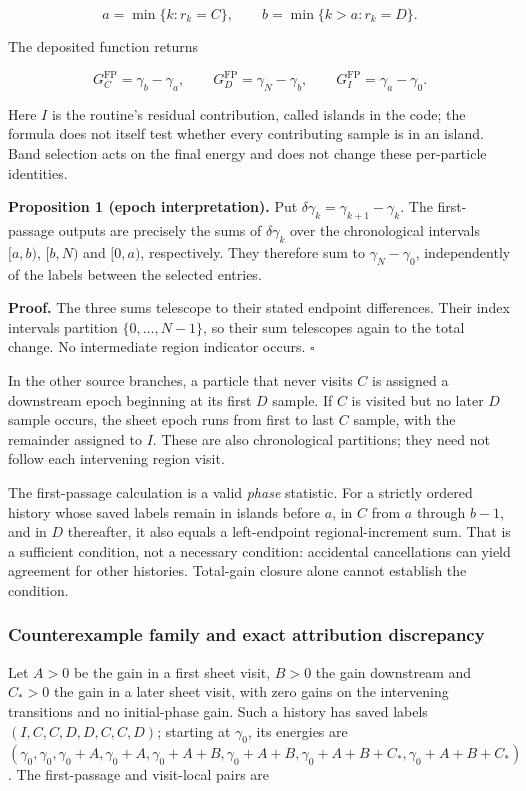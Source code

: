 \[
a=\min\{k:r_k=C\},\qquad
b=\min\{k>a:r_k=D\}.
\]

The deposited function returns

\[
G_C^{\mathrm{FP}}=\gamma_b-\gamma_a,\qquad
G_D^{\mathrm{FP}}=\gamma_N-\gamma_b,\qquad
G_I^{\mathrm{FP}}=\gamma_a-\gamma_0.
\]

Here \(I\) is the routine's residual contribution, called islands in the
code; the formula does not itself test whether every contributing sample
is in an island. Band selection acts on the final energy and does not
change these per-particle identities.

\textbf{Proposition 1 (epoch interpretation).} Put
\(\delta\gamma_k=\gamma_{k+1}-\gamma_k\). The first-passage outputs are
precisely the sums of \(\delta\gamma_k\) over the chronological
intervals \([a,b)\), \([b,N)\) and \([0,a)\), respectively. They
therefore sum to \(\gamma_N-\gamma_0\), independently of the labels
between the selected entries.

\textbf{Proof.} The three sums telescope to their stated endpoint
differences. Their index intervals partition \(\{0,\ldots,N-1\}\), so
their sum telescopes again to the total change. No intermediate region
indicator occurs. \(\square\)

In the other source branches, a particle that never visits \(C\) is
assigned a downstream epoch beginning at its first \(D\) sample. If
\(C\) is visited but no later \(D\) sample occurs, the sheet epoch runs
from first to last \(C\) sample, with the remainder assigned to \(I\).
These are also chronological partitions; they need not follow each
intervening region visit.

The first-passage calculation is a valid \emph{phase} statistic. For a
strictly ordered history whose saved labels remain in islands before
\(a\), in \(C\) from \(a\) through \(b-1\), and in \(D\) thereafter, it
also equals a left-endpoint regional-increment sum. That is a sufficient
condition, not a necessary condition: accidental cancellations can yield
agreement for other histories. Total-gain closure alone cannot establish
the condition.

\subsubsection{Counterexample family and exact attribution
discrepancy}\label{counterexample-family-and-exact-attribution-discrepancy}

Let \(A>0\) be the gain in a first sheet visit, \(B>0\) the gain
downstream and \(C_*>0\) the gain in a later sheet visit, with zero
gains on the intervening transitions and no initial-phase gain. Such a
history has saved labels \((I,C,C,D,D,C,C,D)\); starting at
\(\gamma_0\), its energies are
\((\gamma_0,\gamma_0,\gamma_0+A,\gamma_0+A,
\gamma_0+A+B,\gamma_0+A+B,\gamma_0+A+B+C_*,\gamma_0+A+B+C_*)\). The
first-passage and visit-local pairs are

